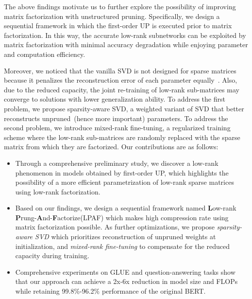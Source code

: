 The above findings motivate us to further explore the possibility of improving matrix factorization with unstructured pruning.  Specifically, we design a sequential framework in which the first-order UP is executed prior to matrix factorization. In this way, the accurate low-rank subnetworks can be exploited by matrix factorization with minimal accuracy degradation while 
enjoying parameter and computation efficiency.

Moreover, we noticed that the vanilla SVD is not designed for 
sparse matrices because it penalizes the reconstruction error of 
each parameter equally~\cite{group}. Also, due to the reduced capacity, 
the joint re-training of low-rank sub-matrices may converge to 
solutions with lower generalization ability. To address the first problem, 
we propose sparsity-aware SVD, a weighted variant of SVD that 
better reconstructs unpruned~(hence more important) parameters. 
To address the second problem, we introduce mixed-rank fine-tuning, 
a regularized training scheme where the low-rank sub-matrices 
are randomly replaced with the sparse matrix from which they are factorized. Our contributions are  as follows:
\begin{itemize}
	\item Through a comprehensive preliminary study, 
	we discover a low-rank phenomenon in models obtained by first-order UP, 
	which highlights the possibility of a more efficient parametrization 
	of low-rank sparse matrices using low-rank factorization.
	\item Based on our findings, we design a sequential framework named  \textbf{L}ow-rank \textbf{P}rung-\textbf{A}nd-\textbf{F}actorize(LPAF) which makes high compression rate using matrix factorization possible.
	As further optimizations, we propose \textit{sparsity-aware SVD} which 
	prioritizes reconstruction of unpruned weights at initialization, 
	and \textit{mixed-rank fine-tuning} to compensate for the reduced capacity 
	during training.
	\item Comprehensive experiments on GLUE and 
	question-answering tasks show that our approach can achieve 
	a 2x-6x reduction in model size and FLOPs while retaining 99.8\%-96.2\% performance of the original BERT.
\end{itemize}
